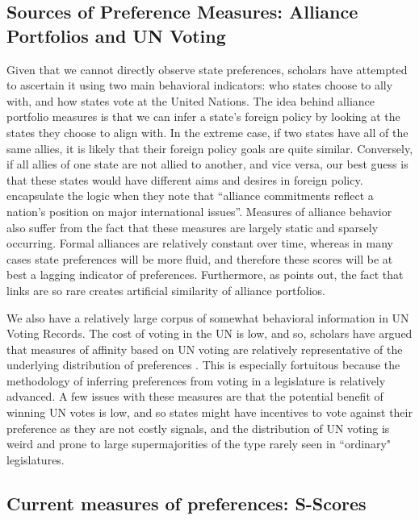 \subsection{Sources of Preference Measures: Alliance Portfolios and UN Voting}

Given that we cannot directly observe state preferences, scholars have attempted to ascertain it using two main behavioral indicators: who states choose to ally with, and how states vote at the United Nations. The idea behind alliance portfolio measures is that we can infer a state's foreign policy by looking at the states they choose to align with. In the extreme case, if two states have all of the same allies, it is likely that their foreign policy goals are quite similar. Conversely, if all allies of one state are not allied to another, and vice versa, our best guess is that these states would have different aims and desires in foreign policy. \citet{bdm:lalman:1992} encapsulate the logic when they note that ``alliance commitments reflect a nation's position on major international issues''. Measures of alliance behavior also suffer from the fact that these measures are largely static and sparsely occurring. Formal alliances are relatively constant over time, whereas in many cases state preferences will be more fluid, and therefore these scores will be at best a lagging indicator of preferences. Furthermore, as \citet{hage:2011} points out, the fact that links are so rare creates artificial similarity of alliance portfolios.

We also have a relatively large corpus of somewhat behavioral information in UN Voting Records. The cost of voting in the UN is low, and so, scholars have argued that measures of affinity based on UN voting are relatively representative of the underlying distribution of preferences \citep{gartzke:1998}. This is especially fortuitous because the methodology of inferring preferences from voting in a legislature is relatively advanced. A few issues with these measures are that the potential benefit of winning UN votes is low, and so states might have incentives to vote against their preference as they are not costly signals, and the distribution of UN voting is weird and prone to large supermajorities of the type rarely seen in ``ordinary" legislatures.

\subsection{Current measures of preferences: S-Scores}

